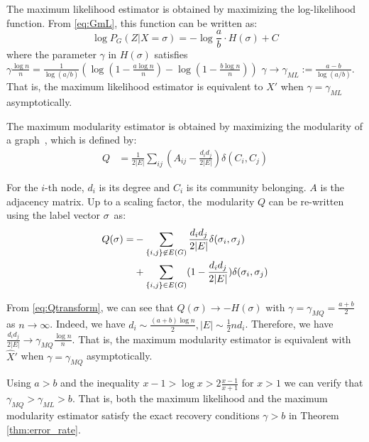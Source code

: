 \documentclass[entropy,article,accept,moreauthors,pdftex]{Definitions/mdpi}
\newcommand{\A}{\frac{a \log n}{n}}
\newcommand{\B}{\frac{b \log n}{n}}
\newcommand{\1}{\mathbbm{1}}
\begin{document}
\begin{paracol}{2}
The maximum likelihood estimator is obtained by maximizing the log-likelihood function.
From \eqref{eq:GmL}, this function can be written as:
$$
\log P_G(Z|X=\sigma) = -\log\frac{a}{b} \cdot H(\sigma) + C
$$
where the parameter $\gamma$ in $H(\sigma)$ satisfies \mbox{$\gamma \frac{\log n}{n} = \frac{1}{\log(a/b)}(\log (1-\A) - \log (1-\B))$}  \mbox{$\gamma \to \gamma_{ML} := \frac{a-b}{\log(a/b)}$}.
That is, the  maximum likelihood estimator is equivalent to $\hat{X}'$ when $\gamma = \gamma_{ML}$ asymptotically.


The maximum modularity estimator is obtained by maximizing the modularity of a graph~\cite{clauset2004finding}, which is defined by:
\begin{align}\label{eq:Q}
Q &= \frac{1}{2 |E|} \sum_{ij} (A_{ij} - \frac{d_i d_j}{2 |E|}) \delta(C_i, C_j)
\end{align}

For the $i$-th node, $d_i$ is its degree and $C_i$ is its community belonging. $A$ is the adjacency matrix.
Up to a scaling factor, the~modularity $Q$ can be re-written using the label vector $\sigma$~as:
\begin{align}
Q(\sigma) = &-\sum_{\{i,j\} \not\in E(G) } \frac{d_i d_j}{2 |E|}\delta(\sigma_i,\sigma_j) \notag \\
&+ \sum_{\{i,j\} \in E(G) } (1 - \frac{d_i d_j}{2 |E|}) \delta(\sigma_i,\sigma_j)  \label{eq:Qtransform}
\end{align}

From \eqref{eq:Qtransform}, we can see that $Q(\sigma) \to -H(\sigma)$ with $\gamma = \gamma_{MQ} = \frac{a+b}{2}$ as $n\to \infty$.
Indeed, we have $d_i \sim \frac{(a+b)\log n}{2}, |E| \sim \frac{1}{2}n d_i$. Therefore, we have $\frac{d_id_j}{2|E|} \to \gamma_{MQ} \frac{\log n}{n} $. That is, the maximum modularity estimator is equivalent with $\hat{X}'$ when $\gamma = \gamma_{MQ}$ asymptotically.


Using $a>b$ and the inequality $x-1>\log x > 2 \frac{x-1}{x+1}$ for $x>1$ we can verify that $\gamma_{MQ} > \gamma_{ML} > b$. That is, both the maximum likelihood and the maximum modularity estimator satisfy the exact recovery conditions $\gamma > b $ in Theorem \ref{thm:error_rate}.



\end{paracol}
\end{document}
